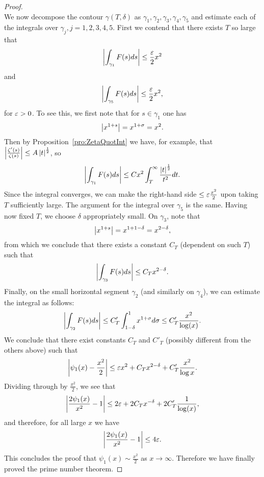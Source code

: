 \begin{proof}
\begin{equation*}
\end{equation*}
	We now decompose the contour $\gamma(T, \delta)$ as $\gamma_1, \gamma_2, \gamma_3, \gamma_4, \gamma_5$ and estimate each of the integrals over $\gamma_j, j=1,2,3,4,5$. First we contend that there exists $T$ so large that
\begin{equation*}
	\left|\int _{\gamma_1} F(s) ds\right|\leq \frac{\varepsilon}{2} x^2
\end{equation*}
	and
\begin{equation*}
	\left|\int _{\gamma_5} F(s) ds\right|\leq \frac{\varepsilon}{2} x^2,
\end{equation*}
	for $\varepsilon > 0$. To see this, we first note that for $s \in \gamma_1$ one has
\begin{equation*}
	\left|x^{1 + s}\right| = x^{1 + \sigma} = x^2.
\end{equation*}
	Then by Proposition~\ref{pro:ZetaQuotInt} we have, for example, that $\left|\frac{\zeta'(s)}{\zeta(s)}\right| \leq A \left|t\right|^{\frac{1}{2}}$, so
\begin{equation*}
	\left|\int _{\gamma_1} F(s) ds\right| \leq C x^2 \int _T ^\infty \frac{\left|t\right|^\frac{1}{2}}{t^2} dt.
\end{equation*}
	Since the integral converges, we can make the right-hand side $\leq \varepsilon \frac{x^2}{2}$ upon taking $T$ sufficiently large. The argument for the integral over $\gamma_5$ is the same. Having now fixed $T$, we choose $\delta$ appropriately small. On $\gamma_3$, note that
\begin{equation*}
	\left|x^{1 + s}\right| = x^{1 + 1 - \delta} = x^{2 - \delta},
\end{equation*}
	from which we conclude that there exists a constant $C_T$ (dependent on such $T$) such that
\begin{equation*}
	\left|\int _{\gamma_3} F(s) ds\right| \leq C_T x^{2 - \delta}.
\end{equation*}
	Finally, on the small horizontal segment $\gamma_2$ (and similarly on $\gamma_4$), we can estimate the integral as follows:
\begin{equation*}
	\left|\int _{\gamma_2} F(s) ds\right| \leq C'_T \int _{1 - \delta} ^1 x^{1 + \sigma} d\sigma \leq C'_T \frac{x^2}{\log(x)}.
\end{equation*}
	We conclude that there exist constants $C_T$ and $C'_T$ (possibly different from the others above) such that
\begin{equation*}
	\left|\psi_1(x) - \frac{x^2}{2}\right| \leq \varepsilon x^2 + C_T x^{2 - \delta} + C'_T \frac{x^2}{\log{x}}.
\end{equation*}
	Dividing through by $\frac{x^2}{2}$, we see that
\begin{equation*}
	\left|\frac{2 \psi_1(x)}{x^2} - 1\right| \leq 2\varepsilon + 2 C_T x^{-\delta} + 2 C'_T \frac{1}{\log(x)},
\end{equation*}
	and therefore, for all large $x$ we have
\begin{equation*}
	\left|\frac{2 \psi_1(x)}{x^2} - 1\right| \leq 4 \varepsilon.
\end{equation*}
	This concludes the proof that $\psi_1(x) \sim \frac{x^2}{2}$ as $x \to \infty$. Therefore we have finally proved the prime number theorem.
\end{proof}